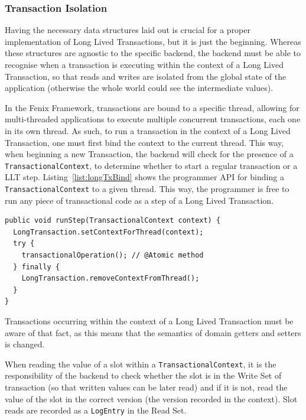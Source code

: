 \documentclass{llncs}
\begin{document}
\subsubsection{Transaction Isolation}

Having the necessary data structures laid out is crucial for a proper
implementation of Long Lived Transactions, but it is just the
beginning. Whereas these structures are agnostic to the specific
backend, the backend must be able to recognise when a transaction is
executing within the context of a Long Lived Transaction, so that
reads and writes are isolated from the global state of the application
(otherwise the whole world could see the intermediate values).

In the Fenix Framework, transactions are bound to a specific thread,
allowing for multi-threaded applications to execute multiple
concurrent transactions, each one in its own thread. As such, to run a
transaction in the context of a Long Lived Transaction, one must first
bind the context to the current thread. This way, when beginning a new
Transaction, the backend will check for the presence of a
\texttt{TransactionalContext}, to determine whether to start a regular
transaction or a LLT step. Listing~\ref{list:longTxBind} shows the
programmer API for binding a \texttt{TransactionalContext} to a given
thread. This way, the programmer is free to run any piece of
transactional code as a step of a Long Lived Transaction.

\begin{lstlisting}[caption={Example of TransactionalContext usage},
  label={list:longTxBind},float]
public void runStep(TransactionalContext context) {
  LongTransaction.setContextForThread(context);
  try {
    transactionalOperation(); // @Atomic method
  } finally {
    LongTransaction.removeContextFromThread();
  }
}
\end{lstlisting}

Transactions occurring within the context of a Long Lived Transaction
must be aware of that fact, as this means that the semantics of domain
getters and setters is changed.

When reading the value of a slot within a
\texttt{TransactionalContext}, it is the responsibility of the backend
to check whether the slot is in the Write Set of transaction (so that
written values can be later read) and if it is not, read the value of
the slot in the correct version (the version recorded in the
context). Slot reads are recorded as a \texttt{LogEntry} in the Read
Set.
\end{document}
